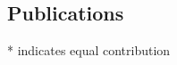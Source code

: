 \documentclass[margin,line,letterpaper]{resume}
\begin{document}
\begin{resume}
    \section{\mysidestyle Publications}

\newcommand\blfootnote[1]{%
  \begingroup
  \renewcommand\thefootnote{}\footnote{#1}%
  \addtocounter{footnote}{-1}%
  \endgroup
}
    
\def\FormatName#1{%
  \def\myname{Siavash Mirarab}
  \def\mynamee{Siavash Mirarab*}%
  \edef\name{#1}%
  \ifx\name\myname
   \underline{#1}%
  \else
    \ifx\name\mynamee
       \underline{Siavash Mirarab}*
    \else
      #1%
    \fi
  \fi
}

* indicates equal contribution

\vspace{-2pt}
\begin{spacing}{1.2}

\end{spacing}


\vspace{-10pt}


\end{resume}
\end{document}
